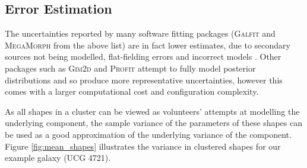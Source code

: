 \documentclass[../main.tex]{subfiles}
\begin{document}
\subsection{Error Estimation}
\label{sec:error_estimation}
The uncertainties reported by many software fitting packages (\textsc{Galfit} and \textsc{MegaMorph} from the above list) are in fact lower estimates, due to secondary sources not being modelled, flat-fielding errors and incorrect models \citep{2010AJ....139.2097P}. Other packages such as \textsc{Gim2d} and \textsc{Profit} attempt to fully model posterior distributions and so produce more representative uncertainties, however this comes with a larger computational cost and configuration complexity.

As all shapes in a cluster can be viewed as volunteers' attempts at modelling the underlying component, the sample variance of the parameters of these shapes can be used as a good approximation of the underlying variance of the component. Figure \ref{fig:mean_shapes} illustrates the variance in clustered shapes for our example galaxy (UCG 4721). %
\end{document}
